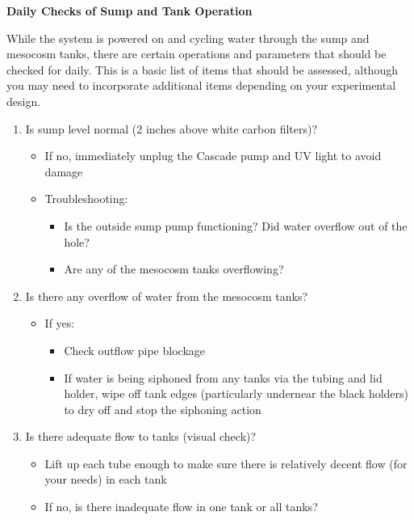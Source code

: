 \documentclass[
]{book}
\providecommand{\tightlist}{%
  \setlength{\itemsep}{0pt}\setlength{\parskip}{0pt}}
\begin{document}
\textbf{Daily Checks of Sump and Tank Operation}

While the system is powered on and cycling water through the sump and mesocosm tanks, there are certain operations and parameters that should be checked for daily. This is a basic list of items that should be assessed, although you may need to incorporate additional items depending on your experimental design.

\begin{enumerate}
\def\labelenumi{\arabic{enumi}.}
\tightlist
\item
  Is sump level normal (2 inches above white carbon filters)?

  \begin{itemize}
  \tightlist
  \item
    If no, immediately unplug the Cascade pump and UV light to avoid damage
  \item
    Troubleshooting:

    \begin{itemize}
    \tightlist
    \item
      Is the outside sump pump functioning? Did water overflow out of the hole?
    \item
      Are any of the mesocosm tanks overflowing?
    \end{itemize}
  \end{itemize}
\item
  Is there any overflow of water from the mesocosm tanks?

  \begin{itemize}
  \tightlist
  \item
    If yes:

    \begin{itemize}
    \tightlist
    \item
      Check outflow pipe blockage
    \item
      If water is being siphoned from any tanks via the tubing and lid holder, wipe off tank edges (particularly undernear the black holders) to dry off and stop the siphoning action
    \end{itemize}
  \end{itemize}
\item
  Is there adequate flow to tanks (visual check)?

  \begin{itemize}
  \tightlist
  \item
    Lift up each tube enough to make sure there is relatively decent flow (for your needs) in each tank
  \item
    If no, is there inadequate flow in one tank or all tanks?


\end{itemize}
\end{enumerate}
\end{document}
